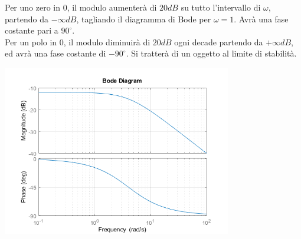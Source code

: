 \documentclass{article}
\numberwithin{equation}{subsection}
\begin{document}
\begin{center}
\end{center}

Per uno zero in $0$, il modulo aumenterà di $20dB$ su tutto l'intervallo di $\omega$, partendo da $-\infty dB$, tagliando il diagramma di Bode per $\omega=1$. 
Avrà una fase costante pari a $90^{\circ}$.
\\
Per un polo in $0$, il modulo diminuirà di $20dB$ ogni decade partendo da $+\infty dB$, ed avrà una fase costante di $-90^{\circ}$. Si tratterà di un oggetto 
al limite di stabilità. 

\begin{center}
    \includegraphics[width=10cm]{Bode1Polo}
\end{center}
\end{document}
